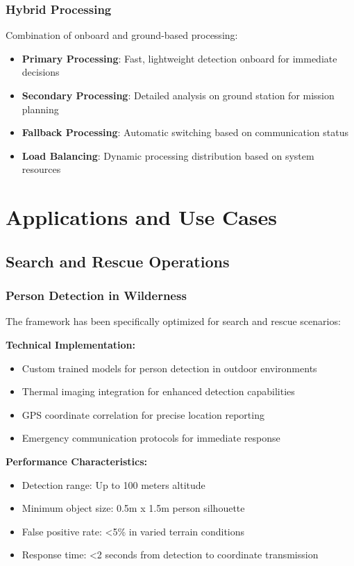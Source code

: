 \documentclass[12pt,a4paper]{article}
\begin{document}
\subsubsection{Hybrid Processing}

Combination of onboard and ground-based processing:

\begin{itemize}
    \item \textbf{Primary Processing}: Fast, lightweight detection onboard for immediate decisions
    \item \textbf{Secondary Processing}: Detailed analysis on ground station for mission planning
    \item \textbf{Fallback Processing}: Automatic switching based on communication status
    \item \textbf{Load Balancing}: Dynamic processing distribution based on system resources
\end{itemize}

\section{Applications and Use Cases}

\subsection{Search and Rescue Operations}

\subsubsection{Person Detection in Wilderness}

The framework has been specifically optimized for search and rescue scenarios:

\textbf{Technical Implementation:}
\begin{itemize}
    \item Custom trained models for person detection in outdoor environments
    \item Thermal imaging integration for enhanced detection capabilities
    \item GPS coordinate correlation for precise location reporting
    \item Emergency communication protocols for immediate response
\end{itemize}

\textbf{Performance Characteristics:}
\begin{itemize}
    \item Detection range: Up to 100 meters altitude
    \item Minimum object size: 0.5m x 1.5m person silhouette
    \item False positive rate: <5\% in varied terrain conditions
    \item Response time: <2 seconds from detection to coordinate transmission
\end{itemize}
\end{document}
